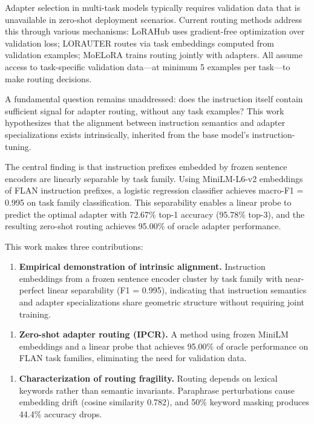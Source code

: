 
Adapter selection in multi-task models typically requires validation data that is unavailable in zero-shot deployment scenarios. Current routing methods address this through various mechanisms: LoRAHub uses gradient-free optimization over validation loss; LORAUTER routes via task embeddings computed from validation examples; MoELoRA trains routing jointly with adapters. All assume access to task-specific validation data---at minimum 5 examples per task---to make routing decisions.

A fundamental question remains unaddressed: does the instruction itself contain sufficient signal for adapter routing, without any task examples? This work hypothesizes that the alignment between instruction semantics and adapter specializations exists intrinsically, inherited from the base model's instruction-tuning.

The central finding is that instruction prefixes embedded by frozen sentence encoders are linearly separable by task family. Using MiniLM-L6-v2 embeddings of FLAN instruction prefixes, a logistic regression classifier achieves macro-F1 = 0.995 on task family classification. This separability enables a linear probe to predict the optimal adapter with 72.67\% top-1 accuracy (95.78\% top-3), and the resulting zero-shot routing achieves 95.00\% of oracle adapter performance.

This work makes three contributions:

\begin{enumerate}
\item \textbf{Empirical demonstration of intrinsic alignment.} Instruction embeddings from a frozen sentence encoder cluster by task family with near-perfect linear separability (F1 = 0.995), indicating that instruction semantics and adapter specializations share geometric structure without requiring joint training.
\end{enumerate}

\begin{enumerate}
\item \textbf{Zero-shot adapter routing (IPCR).} A method using frozen MiniLM embeddings and a linear probe that achieves 95.00\% of oracle performance on FLAN task families, eliminating the need for validation data.
\end{enumerate}

\begin{enumerate}
\item \textbf{Characterization of routing fragility.} Routing depends on lexical keywords rather than semantic invariants. Paraphrase perturbations cause embedding drift (cosine similarity 0.782), and 50\% keyword masking produces 44.4\% accuracy drops.
\end{enumerate}
